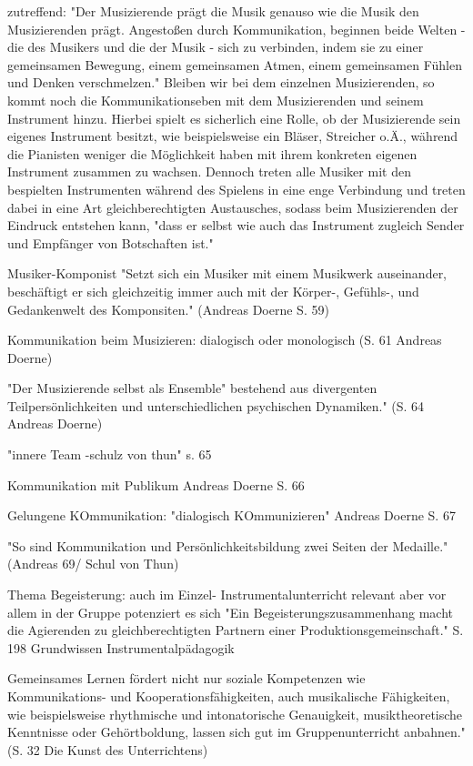 zutreffend:
"Der Musizierende prägt die Musik genauso wie die Musik den Musizierenden prägt.
Angestoßen durch Kommunikation, beginnen beide Welten - die des Musikers und die
der Musik - sich zu verbinden, indem sie zu einer gemeinsamen Bewegung, einem
gemeinsamen Atmen, einem gemeinsamen Fühlen und Denken verschmelzen." \autocite[60]{doerne:umfassend_musizieren}
Bleiben wir bei dem einzelnen Musizierenden, so kommt noch die
Kommunikationseben mit dem Musizierenden und seinem Instrument hinzu. Hierbei
spielt es sicherlich eine Rolle, ob der Musizierende sein eigenes Instrument
besitzt, wie beispielsweise ein Bläser, Streicher o.Ä., während die Pianisten
weniger die Möglichkeit haben mit ihrem konkreten eigenen Instrument zusammen zu
wachsen. Dennoch treten alle Musiker mit den bespielten Instrumenten während des
Spielens in eine enge Verbindung und treten dabei in eine Art gleichberechtigten
Austausches, sodass beim Musizierenden der Eindruck entstehen kann, "dass er selbst wie auch das Instrument zugleich Sender und
Empfänger von Botschaften ist." \autocite[59]{doerne:umfassend_musizieren}


Musiker-Komponist
"Setzt sich ein Musiker mit einem Musikwerk auseinander, beschäftigt er sich
gleichzeitig immer auch mit der Körper-, Gefühls-, und Gedankenwelt des
Komponsiten." (Andreas Doerne S. 59)

Kommunikation beim Musizieren: dialogisch oder monologisch (S. 61 Andreas Doerne)


"Der Musizierende selbst als Ensemble" bestehend aus divergenten Teilpersönlichkeiten und
unterschiedlichen psychischen Dynamiken." (S. 64 Andreas Doerne)

"innere Team -schulz von thun" s. 65

Kommunikation mit Publikum Andreas Doerne S. 66

Gelungene KOmmunikation: "dialogisch KOmmunizieren" Andreas Doerne S. 67

"So sind Kommunikation und Persönlichkeitsbildung zwei Seiten der Medaille."
(Andreas 69/ Schul von Thun)


Thema Begeisterung: auch im Einzel- Instrumentalunterricht relevant aber vor allem in der Gruppe potenziert es
sich "Ein Begeisterungszusammenhang macht die Agierenden zu gleichberechtigten
Partnern einer Produktionsgemeinschaft." S. 198 Grundwissen
Instrumentalpädagogik

Gemeinsames Lernen fördert nicht nur soziale Kompetenzen wie Kommunikations- und
Kooperationsfähigkeiten, auch musikalische Fähigkeiten, wie beispielsweise
rhythmische und intonatorische Genauigkeit, musiktheoretische Kenntnisse oder
Gehörtboldung, lassen sich gut im Gruppenunterricht anbahnen." (S. 32 Die Kunst
des Unterrichtens)


